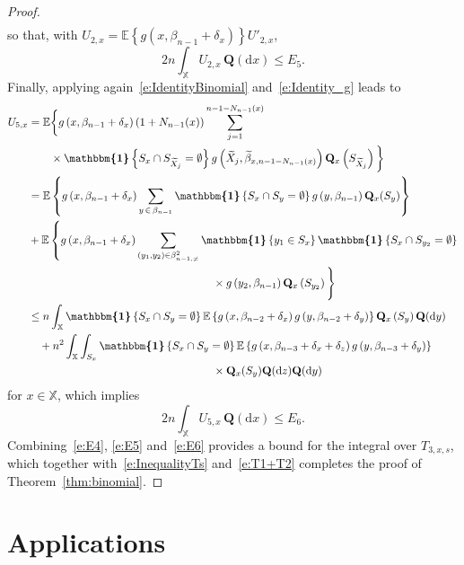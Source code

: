 \documentclass[10pt]{amsart}
\theoremstyle{definition}\newtheorem{defi}[theo]{Definition}\newtheorem{rema}[theo]{Remark}\newtheorem{exam}[theo]{Example}\newtheorem{exem}[theo]{Example}\newtheorem{nota}[theo]{Notation}
\newcommand{\bQ}{\mathbf{Q}}
\newcommand*\X{\mathbb{X}}
\newcommand{\E}{\mathbb{E}}
\newcommand*\md{\mathrm{d}}
\newcommand{\mean}[1] {\E\left\{{#1}\right\}}
\newcommand{\ind}{\boldsymbol{\mathbbm{1}}}
\begin{document}
\begin{proof}
\begin{align*}
\end{align*}
so that, with $U_{2,x}=\mean{g(x,\beta_{n-1}+\delta_x)}U'_{2,x}$,
\begin{equation}\label{e:E5}
2 n\int_{\X} U_{2,x} \, \bQ(\md x) \leq E_5.
\end{equation}
Finally, applying again~\eqref{e:IdentityBinomial} and~\eqref{e:Identity_g} leads to
\begin{align*}
U_{5,x}
& = \E \bigg\{g\left(x,\beta_{n-1}+\delta_x\right) \left(1+N_{n-1}(x)\right) \sum_{j=1}^{n-1-N_{n-1}(x)}\\
&\qquad\times\ind\left\{S_x\cap S_{\widetilde{X}_j}=\emptyset\right\} g\left(\widetilde{X}_j,\widetilde{\beta}_{x,n-1-N_{n-1}(x)}\right) \bQ_x\left(S_{\widetilde{X}_j}\right) \bigg\} \\
& = \mean{ g\left(x,\beta_{n-1}+\delta_x\right) \sum_{y\,\in\,\beta_{n-1}} \ind\left\{S_x\cap S_y = \emptyset\right\} g\left(y,\beta_{n-1}\right) \bQ_x(S_y) } \\
& + \E\left\{ g\left(x,\beta_{n-1}+\delta_x\right) \sum_{\left(y_1,y_2\right)\in\beta_{n-1,\neq}^2} \ind\left\{y_1\in S_x\right\} \ind\left\{S_x\cap S_{y_2}=\emptyset\right\}\right.\\
&\mkern300mu \times g\left(y_2,\beta_{n-1}\right) \bQ_x\left(S_{y_2}\right)\Bigg\} \\
& \leq n \int_{\X} \ind\left\{S_x\cap S_y = \emptyset\right\} \mean{ g\left(x,\beta_{n-2}+\delta_x\right) g\left(y,\beta_{n-2}+\delta_y\right) } \bQ_x\left(S_y\right) \bQ(\md y) \\
& \quad + n^2 \int_{\X} \int_{S_x} \ind\left\{S_x\cap S_y = \emptyset\right\} \mean{g\left(x,\beta_{n-3}+\delta_x+\delta_z\right) g\left(y,\beta_{n-3}+\delta_y\right) } \\
&\mkern300mu\times\bQ_x(S_y) \bQ(\md z) \bQ(\md y) 
\end{align*}
for $x\in\X$, which implies
\begin{equation}\label{e:E6}
2n \int_{\X} U_{5,x} \, \bQ(\md x) \leq E_6.
\end{equation}
Combining~\eqref{e:E4}, \eqref{e:E5} and~\eqref{e:E6} provides a bound for the integral over $T_{3,x,s}$, which together with~\eqref{e:InequalityTs} and~\eqref{e:T1+T2} completes the proof of Theorem~\ref{thm:binomial}.
\end{proof}


\section{Applications}\label{sec:Applications}
\end{document}
